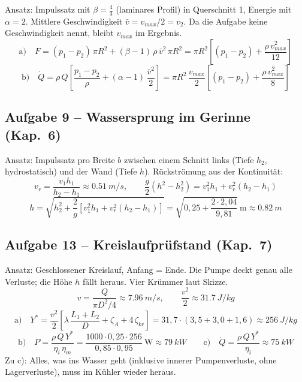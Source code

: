 \documentclass[11pt,a4paper]{article}
\newenvironment{bild}{\par\medskip\noindent\begin{minipage}{\linewidth}\centering}{\end{minipage}\par\medskip}
\begin{document}
Ansatz: Impulssatz mit $\beta = \frac43$ (laminares Profil) in Querschnitt 1, Energie mit $\alpha = 2$. Mittlere Geschwindigkeit $\bar v = v_{max}/2 = v_2$. Da die Aufgabe keine Geschwindigkeit nennt, bleibt $v_{max}$ im Ergebnis.
\[
\text{a)}\quad F = (p_1 - p_2)\,\pi R^2 + (\beta - 1)\,\rho\,\bar v^2\,\pi R^2 = \pi R^2\left[(p_1 - p_2) + \frac{\rho\,v_{max}^2}{12}\right]
\]
\[
\text{b)}\quad \dot Q = \rho\,Q\left[\frac{p_1 - p_2}{\rho} + (\alpha - 1)\,\frac{\bar v^2}{2}\right] = \pi R^2\,\frac{v_{max}}{2}\left[(p_1 - p_2) + \frac{\rho\,v_{max}^2}{8}\right]
\]

\subsection*{Aufgabe 9 -- Wassersprung im Gerinne (Kap.~6)}

\begin{bild}

\end{bild}

Ansatz: Impulssatz pro Breite $b$ zwischen einem Schnitt links (Tiefe $h_2$, hydrostatisch) und der Wand (Tiefe $h$). Rückströmung aus der Kontinuität:
\[
v_r = \frac{v_1 h_1}{h_2 - h_1} \approx \SI{0.51}{m/s},
\qquad
\frac{g}{2}\left(h^2 - h_2^2\right) = v_1^2 h_1 + v_r^2 (h_2 - h_1)
\]
\[
h = \sqrt{h_2^2 + \frac{2}{g}\left[v_1^2 h_1 + v_r^2 (h_2 - h_1)\right]} = \sqrt{0{,}25 + \frac{2\cdot 2{,}04}{9{,}81}}\ \mathrm{m} \approx \SI{0.82}{m}
\]

\subsection*{Aufgabe 13 -- Kreislaufprüfstand (Kap.~7)}

\begin{bild}

\end{bild}

Ansatz: Geschlossener Kreislauf, Anfang = Ende. Die Pumpe deckt genau alle Verluste; die Höhe $h$ fällt heraus. Vier Krümmer laut Skizze.
\[
v = \frac{Q}{\pi D^2/4} \approx \SI{7.96}{m/s}, \qquad \frac{v^2}{2} \approx \SI{31.7}{J/kg}
\]
\[
\text{a)}\quad Y^* = \frac{v^2}{2}\left[\lambda\,\frac{L_1 + L_2}{D} + \zeta_A + 4\,\zeta_{kr}\right] = 31{,}7\cdot(3{,}5 + 3{,}0 + 1{,}6) \approx \SI{256}{J/kg}
\]
\[
\text{b)}\quad P = \frac{\rho\,Q\,Y^*}{\eta_i\,\eta_m} = \frac{1000\cdot 0{,}25\cdot 256}{0{,}85\cdot 0{,}95}\ \mathrm{W} \approx \SI{79}{kW}
\qquad
\text{c)}\quad \dot Q = \frac{\rho\,Q\,Y^*}{\eta_i} \approx \SI{75}{kW}
\]
Zu c): Alles, was ins Wasser geht (inklusive innerer Pumpenverluste, ohne Lagerverluste), muss im Kühler wieder heraus.
\end{document}

